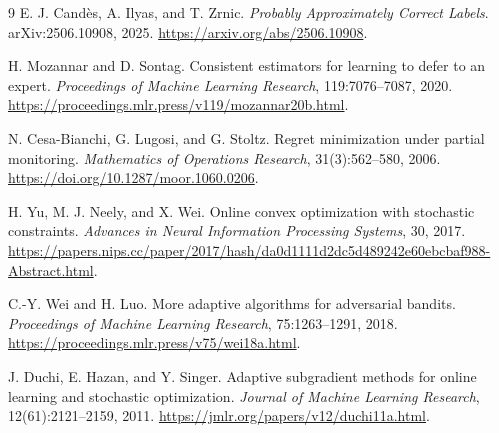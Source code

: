 \documentclass[11pt]{article}
\theoremstyle{remark}
\begin{document}
\begin{thebibliography}{9}
E. J. Cand\`es, A. Ilyas, and T. Zrnic.
\emph{Probably Approximately Correct Labels}.
arXiv:2506.10908, 2025.
\url{https://arxiv.org/abs/2506.10908}.

H. Mozannar and D. Sontag.
Consistent estimators for learning to defer to an expert.
\emph{Proceedings of Machine Learning Research}, 119:7076--7087, 2020.
\url{https://proceedings.mlr.press/v119/mozannar20b.html}.

N. Cesa-Bianchi, G. Lugosi, and G. Stoltz.
Regret minimization under partial monitoring.
\emph{Mathematics of Operations Research}, 31(3):562--580, 2006.
\url{https://doi.org/10.1287/moor.1060.0206}.

H. Yu, M. J. Neely, and X. Wei.
Online convex optimization with stochastic constraints.
\emph{Advances in Neural Information Processing Systems}, 30, 2017.
\url{https://papers.nips.cc/paper/2017/hash/da0d1111d2dc5d489242e60ebcbaf988-Abstract.html}.

C.-Y. Wei and H. Luo.
More adaptive algorithms for adversarial bandits.
\emph{Proceedings of Machine Learning Research}, 75:1263--1291, 2018.
\url{https://proceedings.mlr.press/v75/wei18a.html}.

J. Duchi, E. Hazan, and Y. Singer.
Adaptive subgradient methods for online learning and stochastic optimization.
\emph{Journal of Machine Learning Research}, 12(61):2121--2159, 2011.
\url{https://jmlr.org/papers/v12/duchi11a.html}.
\end{thebibliography}
\end{document}
